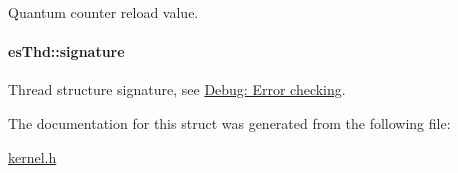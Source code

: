 Quantum counter reload value. 

\hypertarget{structesThd_a72e6c4660e827aae5a621894756a5eb2}{
\paragraph[{signature}]{ es\-Thd\-::signature}}\label{structesThd_a72e6c4660e827aae5a621894756a5eb2}


Thread structure signature, see \hyperlink{errors}{Debug\-: Error checking}. 



The documentation for this struct was generated from the following file\-:\begin{DoxyCompactItemize}
\item 
\hyperlink{kernel_8h}{kernel.\-h}\end{DoxyCompactItemize}
